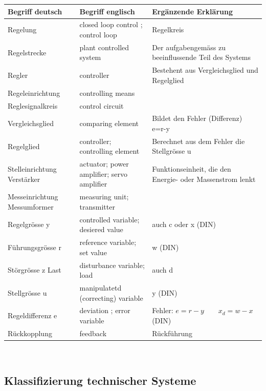 	\begin{tabular}{|p{2.7cm}|p{5.4cm}|l|}
    	\hline
    	{\bf Begriff deutsch}		&{\bf Begriff englisch}	&{\bf Ergänzende
    	Erklärung} \skript{13}\\
		\hline
		Regelung			& closed loop control ; control loop & Regelkreis\\
		\hline
		Regelstrecke		& plant controlled system	&Der aufgabengemäss zu beeinflussende
    	Teil des Systems\\
    	\hline
    	Regler				& controller			&Bestehent aus Vergleichsglied und Regelglied\\
    	\hline
    	Regeleinrichtung	& controlling means&\\
    	\hline
    	Reglesignalkreis	& control circuit&\\
    	\hline
    	Vergleichsglied		& comparing element	&Bildet den Fehler (Differenz)
    											e=r-y\\
    	\hline
    	Regelglied			&controller;
    						controlling element	&Berechnet aus dem Fehler die Stellgrösse u\\
    	\hline
    	Stelleinrichtung
    	Verstärker			&actuator;
					    	power amplifier;
    						servo amplifier		&Funktionseinheit, die den Energie- oder Massenstrom
    											lenkt\\
    	\hline
    	Messeinrichtung
    	Messumformer		&measuring unit;
    						transmitter&\\
    	\hline
    	Regelgrösse y		&controlled variable;
    						desiered value& auch c oder x (DIN)\\
    	\hline
    	Führungsgrösse r	&reference variable;
    						set value& w (DIN)\\
    	\hline
    	Störgrösse z Last	&disturbance variable;
    						load& auch d\\
    	\hline
    	Stellgrösse u		&manipulatetd (correcting)
    						variable& y (DIN)\\
    	\hline
    	Regeldifferenz e	&deviation ; error variable		& Fehler: $e=r-y \quad \quad x_d=w-x$ (DIN) \\
    	\hline
    	Rückkopplung		&feedback			&Rückführung\\
    	\hline

	\end{tabular}\\

		
	\subsection{Klassifizierung technischer Systeme}
		

